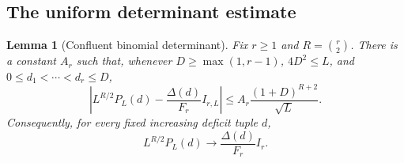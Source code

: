 \documentclass[11pt]{article}
\numberwithin{equation}{section}
\newtheorem{lemma}[lemma]{Lemma}
\theoremstyle{definition}
\newcommand{\vander}{\Delta}
\begin{document}
\subsection{The uniform determinant estimate}

\begin{lemma}[Confluent binomial determinant]\label{lem:uniform}
Fix $r\geq1$ and $R=\binom r2$. There is a constant $A_r$ such that, whenever $D\geq\max(1,r-1)$, $4D^2\leq L$, and $0\leq d_1<\cdots<d_r\leq D$,
\begin{equation}\label{eq:uniform}
 \left|L^{R/2}P_L(d)-\frac{\vander(d)}{F_r}I_{r,L}\right|
 \leq A_r\frac{(1+D)^{R+2}}{\sqrt L}.
\end{equation}
Consequently, for every fixed increasing deficit tuple $d$,
\begin{equation}\label{eq:pointwise}
 L^{R/2}P_L(d)\longrightarrow\frac{\vander(d)}{F_r}I_r.
\end{equation}
\end{lemma}
\end{document}
